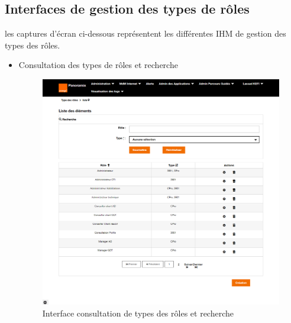 \subsection{Interfaces de gestion des types de rôles}
les captures d'écran ci-dessous représentent les différentes IHM de gestion des types des rôles.
\newpage
\begin{itemize}
	\item Consultation des types de rôles et recherche
	\begin{figure}[H]
		\centering
		\includegraphics[width=0.8\linewidth]{"img/screenshots/type roles/index"}
		\caption[Interface consultation de types des rôles et recherche]{Interface consultation de types des rôles et recherche}
		\label{fig:index-tr}
	\end{figure}


\end{itemize}
